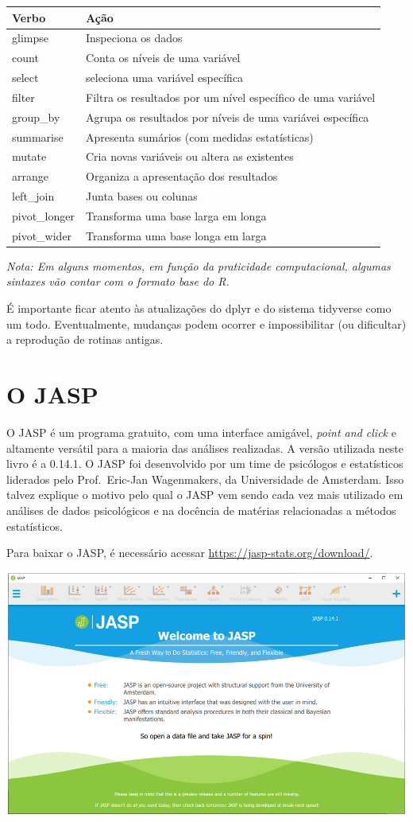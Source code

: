 \documentclass[
]{book}
\begin{document}
\begin{longtable}[]{@{}ll@{}}
\toprule
Verbo & Ação\tabularnewline
\midrule
\endhead
glimpse & Inspeciona os dados\tabularnewline
count & Conta os níveis de uma variável\tabularnewline
select & seleciona uma variável específica\tabularnewline
filter & Filtra os resultados por um nível específico de uma
variável\tabularnewline
group\_by & Agrupa os resultados por níveis de uma variávei
específica\tabularnewline
summarise & Apresenta sumários (com medidas estatísticas)\tabularnewline
mutate & Cria novas variáveis ou altera as existentes\tabularnewline
arrange & Organiza a apresentação dos resultados\tabularnewline
left\_join & Junta bases ou colunas\tabularnewline
pivot\_longer & Transforma uma base larga em longa\tabularnewline
pivot\_wider & Transforma uma base longa em larga\tabularnewline
\bottomrule
\end{longtable}

\emph{Nota: Em alguns momentos, em função da praticidade computacional,
algumas sintaxes vão contar com o formato base do R.}

É importante ficar atento às atualizações do dplyr e do sistema
tidyverse como um todo. Eventualmente, mudanças podem ocorrer e
impossibilitar (ou dificultar) a reprodução de rotinas antigas.

\hypertarget{o-jasp}{%
\section{O JASP}\label{o-jasp}}

O JASP é um programa gratuito, com uma interface amigável, \emph{point
and click} e altamente versátil para a maioria das análises realizadas.
A versão utilizada neste livro é a 0.14.1. O JASP foi desenvolvido por
um time de psicólogos e estatísticos liderados pelo Prof.~Eric-Jan
Wagenmakers, da Universidade de Amsterdam. Isso talvez explique o motivo
pelo qual o JASP vem sendo cada vez mais utilizado em análises de dados
psicológicos e na docência de matérias relacionadas a métodos
estatísticos.

Para baixar o JASP, é necessário acessar
\url{https://jasp-stats.org/download/}.

\includegraphics{./img/cap_jasp_interface.png}
\end{document}
